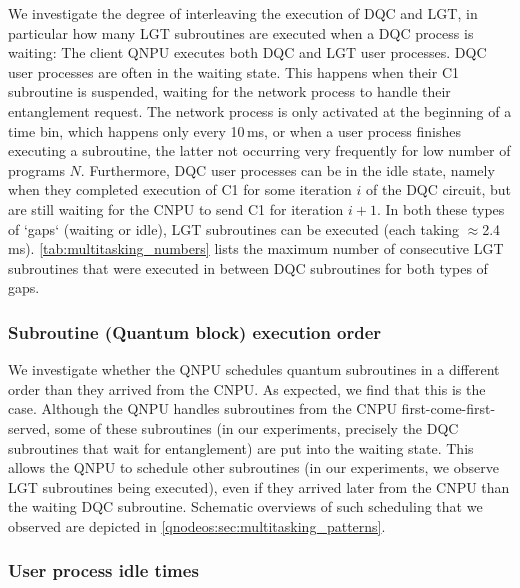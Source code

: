 We investigate the degree of interleaving the execution of \ac{DQC} and \ac{LGT}, in particular how many \ac{LGT} subroutines are executed when a \ac{DQC} process is waiting: The client \ac{QNPU} executes both \ac{DQC} and \ac{LGT} user processes. \ac{DQC} user processes are often in the waiting state. This happens when their C1 subroutine is suspended, waiting for the network process to handle their entanglement request. The network process is only activated at the beginning of a time bin, which happens only every 10\,ms, or when a user process finishes executing a subroutine, the latter not occurring very frequently for low number of programs $N$. Furthermore, \ac{DQC} user processes can be in the idle state, namely when they completed execution of C1 for some iteration $i$ of the \ac{DQC} circuit, but are still waiting for the \ac{CNPU} to send C1 for iteration $i+1$. In both these types of `gaps` (waiting or idle), \ac{LGT} subroutines can be executed (each taking $\approx$2.4\,ms). \cref{tab:multitasking_numbers} lists the maximum number of consecutive \ac{LGT} subroutines that were executed in between \ac{DQC} subroutines  for both types of gaps. 

\subsubsection{Subroutine (Quantum block) execution order}

We investigate whether the \ac{QNPU} schedules quantum subroutines in a different order than they arrived from the \ac{CNPU}. As expected, we find that this is the case. Although the \ac{QNPU} handles subroutines from the \ac{CNPU} first-come-first-served, some of these subroutines (in our experiments, precisely the \ac{DQC} subroutines that wait for entanglement) are put into the waiting state. This allows the \ac{QNPU} to schedule other subroutines (in our experiments, we observe \ac{LGT} subroutines being executed), even if they arrived later from the \ac{CNPU} than the waiting \ac{DQC} subroutine. Schematic overviews of such scheduling that we observed are depicted in \cref{qnodeos:sec:multitasking_patterns}.

\subsubsection{User process idle times}


